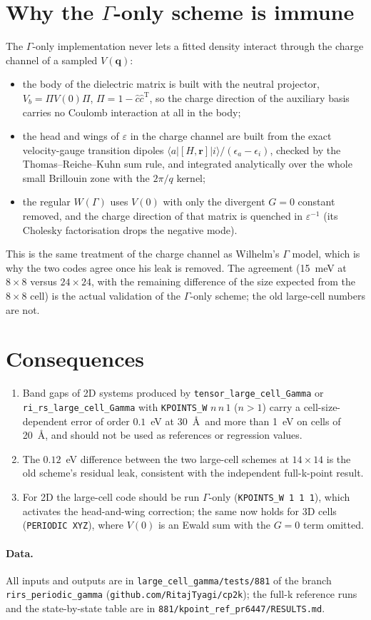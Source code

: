 \documentclass[11pt,a4paper]{article}
\newcommand{\bq}{\mathbf{q}}
\newcommand{\br}{\mathbf{r}}
\begin{document}
\section{Why the $\Gamma$-only scheme is immune}

The $\Gamma$-only implementation never lets a fitted density interact through the charge
channel of a sampled $V(\bq)$:
\begin{itemize}
\item the body of the dielectric matrix is built with the neutral projector,
      $V_b = \Pi V(0)\Pi$, $\Pi = 1 - \hat c\hat c^{\mathrm T}$, so the charge direction of the
      auxiliary basis carries no Coulomb interaction at all in the body;
\item the head and wings of $\varepsilon$ in the charge channel are built from the exact
      velocity-gauge transition dipoles $\langle a|[H,\br]|i\rangle/(\epsilon_a-\epsilon_i)$,
      checked by the Thomas--Reiche--Kuhn sum rule, and integrated analytically over the whole
      small Brillouin zone with the $2\pi/q$ kernel;
\item the regular $W(\Gamma)$ uses $V(0)$ with only the divergent $G = 0$ constant removed, and
      the charge direction of that matrix is quenched in $\varepsilon^{-1}$ (its Cholesky
      factorisation drops the negative mode).
\end{itemize}
This is the same treatment of the charge channel as Wilhelm's $\Gamma$ model, which is why the
two codes agree once his leak is removed. The agreement (15~meV at $8\times8$ versus
$24\times24$, with the remaining difference of the size expected from the $8\times8$ cell) is
the actual validation of the $\Gamma$-only scheme; the old large-cell numbers are not.

\section{Consequences}

\begin{enumerate}
\item Band gaps of 2D systems produced by \texttt{tensor\_large\_cell\_Gamma} or
      \texttt{ri\_rs\_large\_cell\_Gamma} with \texttt{KPOINTS\_W} $n\,n\,1$ ($n>1$) carry a
      cell-size-dependent error of order $0.1$~eV at 30~\AA\ and more than 1~eV on cells of
      20~\AA, and should not be used as references or regression values.
\item The $0.12$~eV difference between the two large-cell schemes at $14\times14$ is the old
      scheme's residual leak, consistent with the independent full-k-point result.
\item For 2D the large-cell code should be run $\Gamma$-only (\texttt{KPOINTS\_W 1 1 1}), which
      activates the head-and-wing correction; the same now holds for 3D cells
      (\texttt{PERIODIC XYZ}), where $V(0)$ is an Ewald sum with the $G=0$ term omitted.
\end{enumerate}

\paragraph{Data.} All inputs and outputs are in \texttt{large\_cell\_gamma/tests/881} of the
branch \texttt{rirs\_periodic\_gamma} (\texttt{github.com/RitajTyagi/cp2k}); the full-k
reference runs and the state-by-state table are in \texttt{881/kpoint\_ref\_pr6447/RESULTS.md}.
\end{document}
